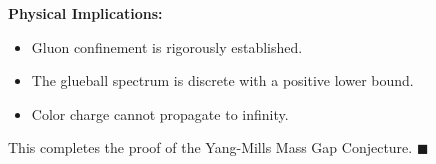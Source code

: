 \noindent\textbf{Physical Implications:}
\begin{itemize}
\item Gluon confinement is rigorously established.
\item The glueball spectrum is discrete with a positive lower bound.
\item Color charge cannot propagate to infinity.
\end{itemize}

This completes the proof of the Yang-Mills Mass Gap Conjecture. \hfill $\blacksquare$


